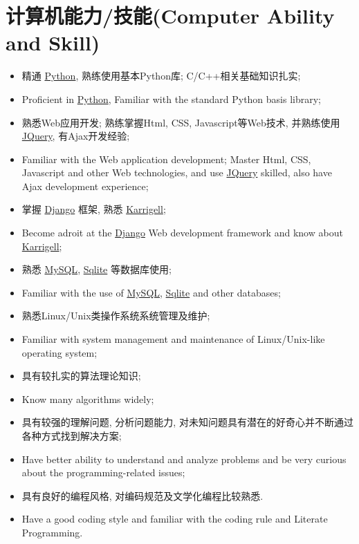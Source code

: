 \documentclass[a4paper,10pt,english]{manual}
\begin{document}
\section{计算机能力/技能(Computer Ability and Skill)}
\begin{itemize}
\item {} 
精通 \href{http://www.python.org/}{Python}, 熟练使用基本Python库; C/C++相关基础知识扎实;

\item {} 
Proficient in \href{http://www.python.org/}{Python}, Familiar with the standard Python basis library;

\item {} 
熟悉Web应用开发; 熟练掌握Html, CSS, Javascript等Web技术, 并熟练使用 \href{http://jquery.com}{JQuery}, 有Ajax开发经验;

\item {} 
Familiar with the Web application development; Master Html, CSS, Javascript and other Web technologies, and  use \href{http://jquery.com}{JQuery} skilled, also have Ajax development experience;

\item {} 
掌握 \href{http://www.djangoproject.com/}{Django} 框架, 熟悉 \href{http://karrigell.sourceforge.net/}{Karrigell};

\item {} 
Become adroit at the \href{http://www.djangoproject.com/}{Django} Web development framework and know about \href{http://karrigell.sourceforge.net/}{Karrigell};

\item {} 
熟悉 \href{http://www.mysql.com}{MySQL}, \href{http://www.sqlite.org}{Sqlite} 等数据库使用;

\item {} 
Familiar with the use of \href{http://www.mysql.com}{MySQL}, \href{http://www.sqlite.org}{Sqlite} and other databases;

\item {} 
熟悉Linux/Unix类操作系统系统管理及维护;

\item {} 
Familiar with system management and maintenance of Linux/Unix-like operating system;

\item {} 
具有较扎实的算法理论知识;

\item {} 
Know many algorithms widely;

\item {} 
具有较强的理解问题, 分析问题能力, 对未知问题具有潜在的好奇心并不断通过各种方式找到解决方案;

\item {} 
Have better ability to understand and analyze problems and be very curious about the programming-related issues;

\item {} 
具有良好的编程风格, 对编码规范及文学化编程比较熟悉.

\item {} 
Have a good coding style and familiar with the coding rule and Literate Programming.

\end{itemize}
\end{document}
